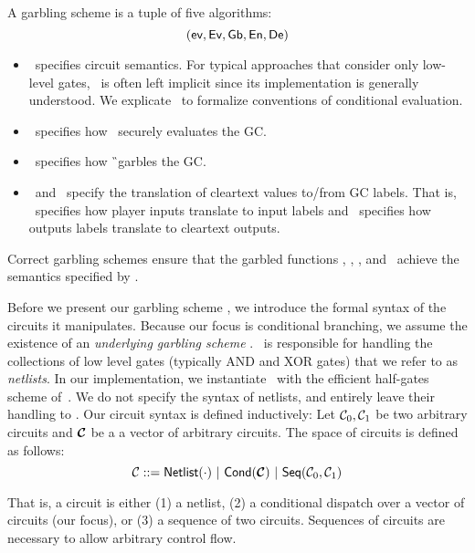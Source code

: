 A garbling scheme is a tuple of five algorithms:
\[ (\textsf{ev}, \textsf{Ev}, \textsf{Gb}, \textsf{En}, \textsf{De}) \]
%
\begin{itemize}
  \item \gev\ specifies circuit semantics. For typical approaches that
    consider only low-level gates, \gev\ is often left implicit since its
    implementation is generally understood. We explicate \gev\ to formalize
    conventions of conditional evaluation.
  \item \gEv\ specifies how \E\ securely evaluates the GC.
  \item \gGb\ specifies how \G\ garbles the GC.
  \item \gEn\ and \gDe\ specify the translation of cleartext values
    to/from GC labels. That is, \gEn\ specifies how player
    inputs translate to input labels and \gDe\ specifies how outputs
    labels translate to cleartext outputs.
\end{itemize}
%
Correct garbling schemes ensure that the garbled functions \gGb, \gEn,
\gEv, and \gDe\ achieve the semantics specified by \gev.

Before we present our garbling scheme \ourschemelong, we introduce the
formal syntax of the circuits it manipulates.
Because our focus is conditional branching, we assume the existence of
an \emph{underlying garbling scheme} \underscheme.
\underscheme\ is responsible for handling the collections of low level
gates (typically AND and XOR gates) that we refer to as \emph{netlists}.
In our implementation, we instantiate \underscheme\ with the efficient
half-gates scheme of~\cite{EC:ZahRosEva15}.
We do not specify the syntax of netlists, and entirely leave their
handling to \underscheme.
Our circuit syntax is defined inductively:
Let $\mathcal C_0, \mathcal C_1$ be two arbitrary circuits and $\vec \cir$ be a
a vector of arbitrary circuits. The space of
circuits is defined as follows:
\[
  \cir ::= \netlist(\cdot)~|~%
  \conditional(\vec \cir)~|~%
  \sequential(\cir_0, \cir_1)
\]

That is, a circuit is either (1) a netlist, (2) a conditional dispatch
over a vector of circuits (our focus), or (3) a sequence of two
circuits.
Sequences of circuits are necessary to allow arbitrary
control flow.


